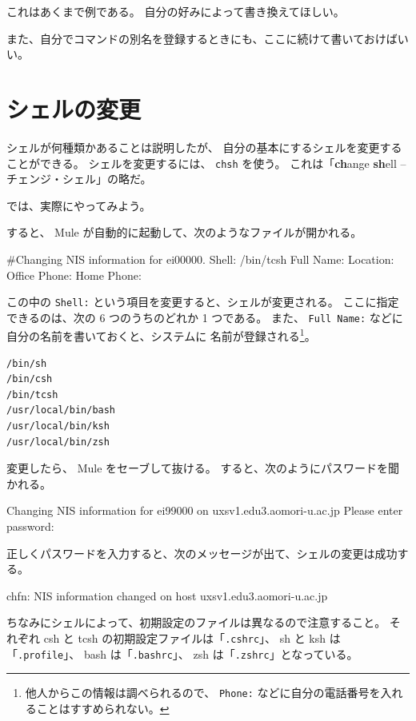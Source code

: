 これはあくまで例である。
自分の好みによって書き換えてほしい。

また、自分でコマンドの別名を登録するときにも、ここに続けて書いておけばいい。

\newpage

\section{シェルの変更}

シェルが何種類かあることは説明したが、
自分の基本にするシェルを変更することができる。
シェルを変更するには、 \texttt{chsh} を使う。
これは「\textbf{ch}ange \textbf{sh}ell -- チェンジ・シェル」の略だ。

では、実際にやってみよう。

\begin{progls}
\end{progls}

すると、 Mule が自動的に起動して、次のようなファイルが開かれる。

\begin{progls}
#Changing NIS information for ei00000.
Shell: /bin/tcsh
Full Name:
Location: 
Office Phone: 
Home Phone: 
\end{progls}

この中の \texttt{Shell:} という項目を変更すると、シェルが変更される。
ここに指定できるのは、次の 6 つのうちのどれか 1 つである。
また、 \texttt{Full Name:} などに自分の名前を書いておくと、システムに
名前が登録される\footnote{他人からこの情報は調べられるので、
 \texttt{Phone:} などに自分の電話番号を入れることはすすめられない。}。

\begin{verbatim}
/bin/sh
/bin/csh
/bin/tcsh
/usr/local/bin/bash
/usr/local/bin/ksh
/usr/local/bin/zsh
\end{verbatim}

変更したら、 Mule をセーブして抜ける。
すると、次のようにパスワードを聞かれる。

\begin{progls}
Changing NIS information for ei99000 on uxsv1.edu3.aomori-u.ac.jp
Please enter password: 
\end{progls}

正しくパスワードを入力すると、次のメッセージが出て、シェルの変更は成功する。

\begin{progls}
chfn: NIS information changed on host uxsv1.edu3.aomori-u.ac.jp
\end{progls}

ちなみにシェルによって、初期設定のファイルは異なるので注意すること。
それぞれ csh と tcsh の初期設定ファイルは「\texttt{.cshrc}」、
sh と ksh は「\texttt{.profile}」、
bash は「\texttt{.bashrc}」、
zsh は「\texttt{.zshrc}」となっている。
